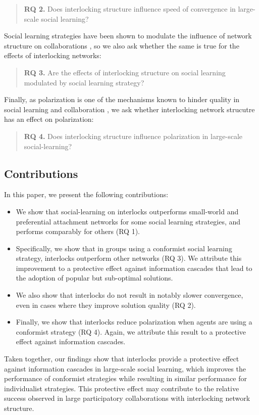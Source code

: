 \documentclass[manuscript,screen,review,acmsmall]{acmart}
\begin{document}
\begin{quote}
{\bfseries RQ 2.} Does interlocking structure influence speed of convergence in large-scale social learning?
\end{quote}

Social learning strategies have been shown to modulate the influence of network structure on collaborations
\cite{barkoczi_social_2016, zollman_social_2012},
so we also ask whether the same is true for the effects of interlocking networks:

\begin{quote}
{\bfseries RQ 3.} Are the effects of interlocking structure on social learning modulated by social learning strategy?
\end{quote}

Finally, as polarization is one of the mechanisms known to hinder quality in social learning and collaboration
\cite{schkade_what_2007, zollman_social_2012},
we ask whether interlocking network strucutre has an effect on polarization:

\begin{quote}
{\bfseries RQ 4.} Does interlocking structure influence polarization in large-scale social-learning?
\end{quote}

\subsection{Contributions}
In this paper, we present the following contributions:
\begin{itemize}
\item{We show that social-learning on interlocks outperforms small-world and preferential attachment networks for some social learning strategies, and performs comparably for others (RQ 1).}
\item{Specifically, we show that in groups using a conformist social learning strategy, interlocks outperform other networks (RQ 3).
We attribute this improvement to a protective effect against information cascades that lead to the adoption of popular but sub-optimal solutions.}
\item{We also show that interlocks do not result in notably slower convergence, even in cases where they improve solution quality (RQ 2).}
\item{Finally, we show that interlocks reduce polarization when agents are using a conformist strategy (RQ 4).
Again, we attribute this result to a protective effect against information cascades.}
\end{itemize}
Taken together, our findings show that interlocks provide a protective effect against information cascades in large-scale social learning, which improves the performance of conformist strategies while resulting in similar performance for individualist strategies.
This protective effect may contribute to the relative success observed in large participatory collaborations with interlocking network structure.
\end{document}
